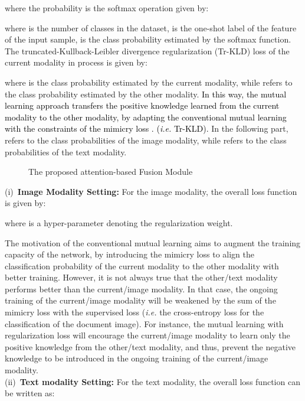 \documentclass[twocolumn]{svjour3}
\newcommand{\ie}{\textit{i.e. }}
\begin{document}
where the probability  is the softmax operation given by:
 

where  is the number of classes in the dataset,  is the one-shot label of the feature  of the input sample,  is the class probability estimated by the softmax function.
The truncated-Kullback-Leibler divergence regularization (Tr-KLD) loss of the current modality in process  is given by:



where  is the class probability estimated by the current modality, while  refers to the class probability estimated by the other modality. \textcolor{black}{In this way, the mutual learning approach transfers the positive knowledge learned from the current modality to the other modality, by adapting the conventional mutual learning with the constraints of the mimicry loss . (\ie Tr-KLD).} In the following part,  refers to the class probabilities of the image modality, while  refers to the class probabilities of the text modality. \\

\begin{figure*}[htb]
\centering
\begin{minipage}{.9\textwidth}
  \centering
  \quad
\end{minipage}
\hspace{0.1\linewidth}
\begin{minipage}{.9\textwidth}
  \centering
  \quad
\end{minipage}
\caption{The proposed attention-based Fusion Module}
\label{fig:Attention_module}

\end{figure*}

(i)\noindent~\textbf{Image Modality Setting:}
For the image modality, the overall loss function  is given by:    


 
where  is a hyper-parameter denoting the regularization weight.

The motivation of the conventional mutual learning aims to augment the training capacity of the network, by introducing the mimicry loss to align the classification probability of the current modality to the other modality with better training. However, it is not always true that the other/text modality performs better than the current/image modality. In that case, the ongoing training of the current/image modality will be weakened by the sum of the mimicry loss with the supervised loss (\ie the cross-entropy loss for the classification of the document image). For instance, the mutual learning with regularization  loss will encourage the current/image modality to learn only the positive knowledge from the other/text modality, and thus, prevent the negative knowledge to be introduced in the ongoing training of the current/image modality. \\
(ii)\noindent~\textbf{Text modality Setting:}
For the text modality, the overall loss function  can be written as:  
\end{document}
